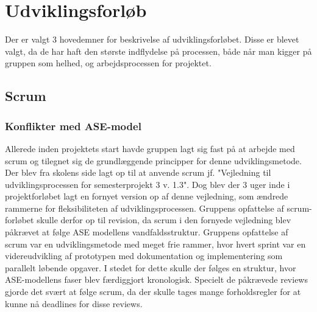 \section{Udviklingsforløb}
Der er valgt 3 hovedemner for beskrivelse af udviklingsforløbet. Disse er blevet valgt, da de har haft den største indflydelse på processen, både når man kigger på gruppen som helhed, og arbejdsprocessen for projektet.  

\subsection{Scrum}
\subsubsection{Konflikter med ASE-model}
Allerede inden projektets start havde gruppen lagt sig fast på at arbejde med scrum og tilegnet sig de grundlæggende principper for denne udviklingsmetode. Der blev fra skolens side lagt op til at anvende scrum jf. "Vejledning til udviklingsprocessen for semesterprojekt 3 v. 1.3". Dog blev der 3 uger inde i projektforløbet lagt en fornyet version op af denne vejledning, som ændrede rammerne for fleksibiliteten af udviklingsprocessen. Gruppens opfattelse af scrum-forløbet skulle derfor op til revision, da scrum i den fornyede vejledning blev påkrævet at følge ASE modellens vandfaldsstruktur. Gruppens opfattelse af scrum var en udviklingsmetode med meget frie rammer, hvor hvert sprint var en videreudvikling af prototypen med dokumentation og implementering som 
parallelt løbende opgaver. I stedet for dette skulle der følges en struktur, hvor ASE-modellens faser blev færdiggjort kronologisk. Specielt de påkrævede reviews gjorde det svært at følge scrum, da der skulle tages mange forholdsregler for at kunne nå deadlines for disse reviews.
 
